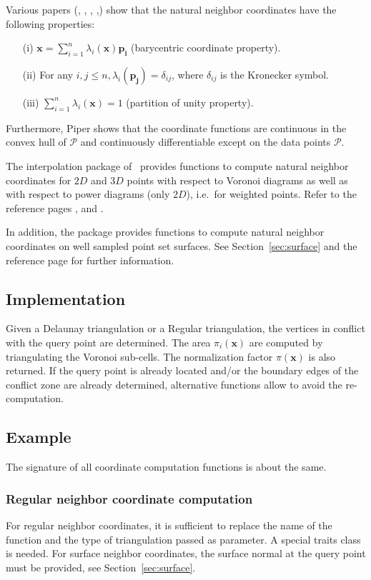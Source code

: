 Various papers (\cite{s-vidt-80}, \cite{f-sodt-90},
\cite{cgal:p-plcbd-93}, \cite{b-scaps-97},\cite{hs-vbihc-00}) show that
the natural neighbor coordinates have the following properties:
  \begin{itemize}
  \item[(i)] $\mathbf{x} = \sum_{i=1}^n \lambda_i(\mathbf{x}) \mathbf{p_i}$
    (barycentric coordinate property).
  \item[(ii)] For any $i,j \leq n, \lambda_i(\mathbf{p_j})=
    \delta_{ij}$, where $\delta_{ij}$ is the Kronecker symbol.
  \item[(iii)] $\sum_{i=1}^n \lambda_i(\mathbf{x}) = 1$ (partition of unity
    property).
  \end{itemize}
  Furthermore, Piper \cite{cgal:p-plcbd-93} shows that the coordinate
  functions are continuous in the convex hull of $\mathcal{P}$ and
  continuously differentiable except on the data points $\mathcal{P}$.
  \medskip
  
  The interpolation package of \cgal\ provides functions to compute
  natural neighbor coordinates for $2D$ and $3D$ points with respect
  to Voronoi diagrams as well as with respect to power diagrams (only
  $2D$), i.e.\ for weighted points. Refer to the reference pages
  ,
   and
  .
  
  In addition, the package provides functions to compute natural
  neighbor coordinates on well sampled point set surfaces. See
  Section~\ref{sec:surface} and the reference page
   for further information.

\subsection{Implementation}
Given a Delaunay triangulation or a Regular triangulation, the
vertices in conflict with the query point are determined. The area
$\pi_i(\mathbf{x})$ are computed by triangulating the Voronoi
sub-cells.  The normalization factor $\pi(\mathbf{x})$ is also
returned. If the query point is already located and/or the boundary
edges of the conflict zone are already determined, alternative
functions allow to avoid the re-computation.

\subsection{Example}
The signature of all coordinate computation functions is about the
same.
\subsubsection{Regular neighbor coordinate computation}
For regular neighbor coordinates, it is sufficient to replace the name
of the function and the type of triangulation passed as parameter. A
special traits class is needed.
For surface neighbor coordinates, the surface normal at the query
point must be provided, see Section~\ref{sec:surface}.
%
